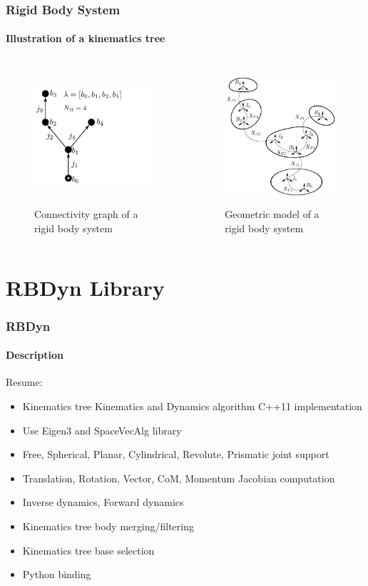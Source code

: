 \documentclass{beamer}
\begin{document}
	\begin{frame}
		\frametitle{Rigid Body System}
		\framesubtitle{Illustration of a kinematics tree}
		\begin{columns}[T]
			\begin{column}[T]{5cm}
				\begin{figure}
					\includegraphics[height=5cm]{img/robot1_graph.pdf}
					\caption{Connectivity graph of a rigid body system}
				\end{figure}
			\end{column}
			\begin{column}[T]{5cm}
				\begin{figure}
					\includegraphics[height=5cm]{img/robot1_illu.pdf}
					\caption{Geometric model of a rigid body system}
				\end{figure}
			\end{column}
	     \end{columns}
	\end{frame}



	\section{RBDyn Library}
  	\begin{frame}
		\frametitle{RBDyn}
		\framesubtitle{Description}
		Resume:
		\begin{itemize}
			\item Kinematics tree Kinematics and Dynamics algorithm C++11 implementation
			\item Use Eigen3 and SpaceVecAlg library
			\item Free, Spherical, Planar, Cylindrical, Revolute, Prismatic joint support
			\item Translation, Rotation, Vector, CoM, Momentum Jacobian computation
			\item Inverse dynamics, Forward dynamics
			\item Kinematics tree body merging/filtering
			\item Kinematics tree base selection
			\item Python binding
		\end{itemize}
	\end{frame}
\end{document}
